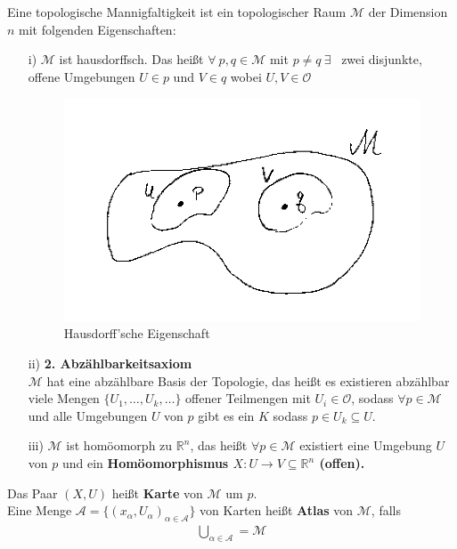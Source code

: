 \begin{defs}
Eine topologische Mannigfaltigkeit ist ein topologischer Raum $\mathcal{M}$ der Dimension $n$ mit folgenden Eigenschaften:
\begin{enumerate}
	\item[i)] $\mathcal{M}$ ist hausdorffsch. Das heißt $\forall \ p, q \in \mathcal{M}$ mit $p \neq q \  \exists$ \ zwei disjunkte, offene Umgebungen $U \in p$ und $V \in q$ wobei $U, V \in \mathcal{O}$
\begin{figure}[h]
\centering
\includegraphics[width=0.4\linewidth]{figures/scan/hausdorff.png}
\caption{Hausdorff'sche Eigenschaft}
\label{img:hausdorff}
\end{figure} 	
	\item[ii)] \textbf{2. Abzählbarkeitsaxiom}  \\
	$\mathcal{M}$ hat eine abzählbare Basis der Topologie, das heißt es existieren abzählbar viele Mengen $\{U_1, \dots, U_k, \dots\}$ offener Teilmengen mit $U_i \in \mathcal{O}$, sodass $\forall p \in \mathcal{M}$ und alle Umgebungen $U$ von $p$ gibt es ein $K$ sodass $p \in U_k \subseteq U$.
	\item [iii)] $\mathcal{M}$ ist homöomorph zu $\mathbb{R}^n$, das heißt $\forall p \in \mathcal{M}$ existiert eine Umgebung $U$ von $p$ und ein \bfseries Homöomorphismus \normalfont $X: U \rightarrow V \subseteq \mathbb{R}^n$ (offen).
\end{enumerate} 
\end{defs}
\begin{minipage}[H]{.8\textwidth}
\begin{defs}
	Das Paar $(X, U)$ heißt \textbf{Karte} von $\mathcal{M}$ um $p$. \\
	Eine Menge $\mathcal{A} = \{(x_{\alpha},U_{\alpha})_{\alpha \in \mathcal{A}}\}$ von Karten heißt \textbf{Atlas} von $\mathcal{M}$, falls \\
	\begin{align}
	\bigcup\limits_{\alpha \in \mathcal{A}} = \mathcal{M}
	\end{align}
\end{defs}
\end{minipage}
